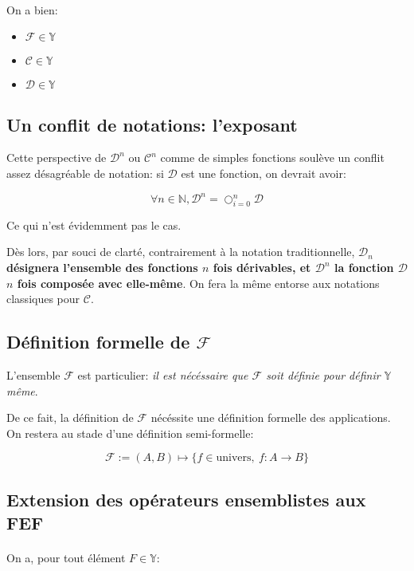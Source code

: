 \documentclass{article}
\newcommand{\Y}{{\mathbb Y}}
\newcommand{\N}{{\mathbb N}}
\newcommand{\cC}{{\mathcal C}}
\newcommand{\cD}{{\mathcal D}}
\newcommand{\cF}{{\mathcal F}}
\begin{document}
\paragraph{}
On a bien:

\begin{itemize}
	\item $\cF \in \Y$
	\item $\cC \in \Y$
	\item $\cD \in \Y$
\end{itemize}



\subsection{Un conflit de notations: l'exposant}

Cette perspective de $\cD^n$ ou $\cC^n$ comme de simples fonctions soulève un conflit assez désagréable de notation: si $\cD$ est une fonction, on devrait avoir:

\[
	\forall n \in \N, \cD^n = \bigcirc_{i=0}^n \cD
\] 

Ce qui n'est évidemment pas le cas.

Dès lors, par souci de clarté, contrairement à la notation traditionnelle, {\bf $\cD_n$ désignera l'ensemble des fonctions $n$ fois dérivables, et $\cD^n$ la fonction $\cD$ $n$ fois composée avec elle-même}. On fera la même entorse aux notations classiques pour $\cC$.

\subsection{Définition formelle de $\cF$}
\label{formal_def_F}

L'ensemble $\cF$ est particulier: \emph{il est nécéssaire que $\cF$ soit définie pour définir $\Y$ même}.

De ce fait, la définition de $\cF$ nécéssite une définition formelle des applications.
On restera au stade d'une définition semi-formelle:

\[
	\cF := (A, B) \mapsto \{ f \in \text{univers},\ f:A\to B\} 
\]

\subsection{Extension des opérateurs ensemblistes aux FEF}

\paragraph{}
On a, pour tout élément $F \in \Y$:
\end{document}
